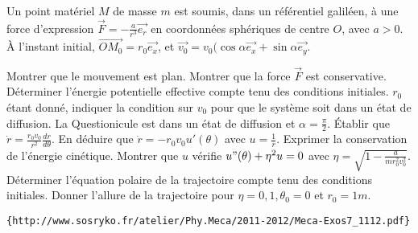\begin{Exercise}[title=Force centrale en $\frac{1}{r^3}$]
  Un point matériel $M$ de masse $m$ est soumis, dans un référentiel galiléen, à une force d'expression $\vec{F}=- \frac{a}{r^3}\vec{e_r}$ en coordonnées sphériques de centre $O$, avec $a>0$. À l'instant initial, $\vec{OM_0}=r_0 \vec{e_x}$, et $\vec{v_0}=v_0(\cos \alpha \vec{e_x} + \sin \alpha \vec{e_y}$.


  \Question Montrer que le mouvement est plan.
  \Question Montrer que la force $\vec{F}$ est conservative. Déterminer l'énergie potentielle effective compte tenu des conditions initiales.
  \Question $r_0$ étant donné, indiquer la condition sur $v_0$ pour que le système soit dans un état de diffusion.
  \Question La Questionicule est dans un état de diffusion et $\alpha = \frac{\pi}{2}$. Établir que $\dot{r} = \frac{r_0 v_0}{r^2} \frac{dr}{d\theta}$. En déduire que $\dot{r} = -r_0v_0 u'(\theta)$ avec $u=\frac{1}{r}$.
  \Question Exprimer la conservation de l'énergie cinétique. Montrer que $u$ vérifie $u"(\theta) + \eta^2 u = 0$ avec $\eta = \sqrt{1-\frac{a}{m r_0^2v_0^2}}$.
  \Question Déterminer l'équation polaire de la trajectoire compte tenu des conditions initiales.
  \Question Donner l'allure de la trajectoire pour $\eta=0,1, \theta_0 = 0$ et $r_0 = 1m$.
\end{Exercise}
\begin{Answer}
\begin{verbatim}
{http://www.sosryko.fr/atelier/Phy.Meca/2011-2012/Meca-Exos7_1112.pdf}
\end{verbatim}
\end{Answer}
